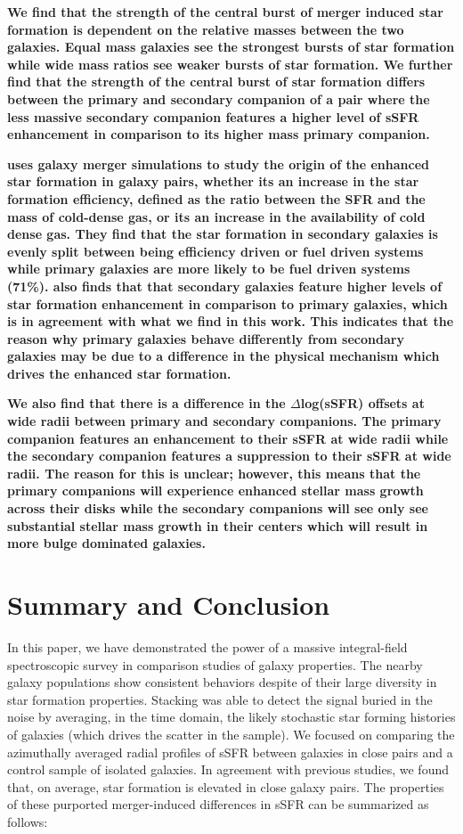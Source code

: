 \documentclass[iop,revtex4,twocolumn,apj,numberedappendix,appendixfloats]{emulateapj}
\begin{document}
\textbf{
We find that the strength of the central burst of merger induced star formation is dependent on the relative masses between the two galaxies. Equal mass galaxies see the strongest bursts of star formation while wide mass ratios see weaker bursts of star formation. We further find that the strength of the central burst of star formation differs between the primary and secondary companion of a pair where the less massive secondary companion features a higher level of sSFR enhancement in comparison to its higher mass primary companion. 
}

\textbf{
\citet{Moreno:2020} uses galaxy merger simulations to study the origin of the enhanced star formation in galaxy pairs, whether its an increase in the star formation efficiency, defined as the ratio between the SFR and the mass of cold-dense gas, or its an increase in the availability of cold dense gas. They find that the star formation in secondary galaxies is evenly split between being efficiency driven or fuel driven systems while primary galaxies are more likely to be fuel driven systems (71\%). \citet{Moreno:2020} also finds that that secondary galaxies feature higher levels of star formation enhancement in comparison to primary galaxies, which is in agreement with what we find in this work. This indicates that the reason why primary galaxies behave differently from secondary galaxies may be due to a difference in the physical mechanism which drives the enhanced star formation. 
}

\textbf{
We also find that there is a difference in the $\Delta$log(sSFR) offsets at wide radii between primary and secondary companions. The primary companion features an enhancement to their sSFR at wide radii while the secondary companion features a suppression to their sSFR at wide radii. The reason for this is unclear; however, this means that the primary companions will experience enhanced stellar mass growth across their disks while the secondary companions will see only see substantial stellar mass growth in their centers which will result in more bulge dominated galaxies.
}

\section{Summary and Conclusion}\label{sec:sum}

In this paper, we have demonstrated the power of a massive integral-field spectroscopic survey in comparison studies of galaxy properties. The nearby galaxy populations show consistent behaviors despite of their large diversity in star formation properties. Stacking was able to detect the signal buried in the noise by averaging, in the time domain, the likely stochastic star forming histories of galaxies (which drives the scatter in the sample). We focused on comparing the azimuthally averaged radial profiles of sSFR between galaxies in close pairs and a control sample of isolated galaxies. In agreement with previous studies, we found that, on average, star formation is elevated in close galaxy pairs. The properties of these purported merger-induced differences in sSFR can be summarized as follows:
\end{document}

